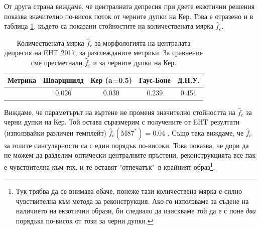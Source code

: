 От друга страна виждаме, че централната депресия при двете екзотични решения показва значително по-висок поток от черните дупки на Кер. Това е отразено и в таблица \ref{table:f_2017}, където са показани стойностите на количествената мярка $\hat{f}_c$.

\begin{table}[h!]
	\centering
	\begin{tabular}{||c|c|c|c|c||}
		\hline
		{Метрика} & {Шварцшилд}&{Кер (a=0.5)}&{Гаус-Боне}&{Д.Н.У.}
		\\\hline
		{\thead{$\hat{f}_c$}} & 0.026&0.030&0.239&0.451
		\\\hline
	\end{tabular}
	\caption[Количествената мярка $\hat{f}_c$ за морфологията на централата депресия на EHT 2017]{\small Количествената мярка $\hat{f}_c$ за морфологията на централата депресия на EHT 2017, за разглежданите метрики. За сравнение сме пресметнали $\hat{f}_c$ и за черните дупки на Кер.}
	\label{table:f_2017}
\end{table}

Виждаме, че параметърът на въртене не променя значително стойността на $\hat{f}_c$ за черни дупки на Кер. Той остава съразмерим с получените от EHT резултати (използвайки различен темплейт) $\hat{f}_c(\text{M}87^*) = 0.04$ \cite{EHT_M87_IV}. Също така виждаме, че $\hat{f}_c$ за голите сингулярности са с един порядък по-високи. Това показва, че дори да не можем да разделим оптически централните пръстени, реконструкцията все пак е чувствителна към тях, и те оставят "отпечатък"$\,$ в крайният образ\footnote{Тук трябва да се внимава обаче, понеже тази количествена мярка е силно чувствителна към метода за реконструкция. Ако го използваме за съдене на наличието на екзотични образи, би следвало да изискваме той да е с поне \emph{два} порядъка по-висок от този за черни дупки.}.

\newpage

